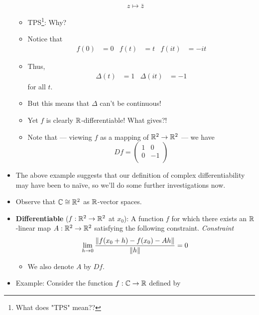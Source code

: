\documentclass[../notes.tex]{subfiles}
\begin{document}
\begin{itemize}
\begin{equation*}
        z \mapsto \bar{z}
    \end{equation*}
    \begin{itemize}
        \item TPS\footnote{What does "TPS" mean??}: Why?
        \item Notice that
        \begin{align*}
            f(0) &= 0&
            f(t) &= t&
            f(it) &= -it
        \end{align*}
        \item Thus,
        \begin{align*}
            \Delta(t) &= 1&
            \Delta(it) &= -1
        \end{align*}
        for all $t$.
        \item But this means that $\Delta$ can't be continuous!
        \item Yet $f$ is clearly $\mathbb{R}$-differentiable! What gives?!
        \item Note that --- viewing $f$ as a mapping of $\mathbb{R}^2\to\mathbb{R}^2$ --- we have
        \begin{equation*}
            Df =
            \begin{pmatrix}
                1 & 0\\
                0 & -1\\
            \end{pmatrix}
        \end{equation*}
    \end{itemize}
    \item The above example suggests that our definition of complex differentiability may have been to na\"{i}ve, so we'll do some further investigations now.
    \item Observe that $\mathbb{C}\cong\mathbb{R}^2$ as $\mathbb{R}$-vector spaces.
    \item \textbf{Differentiable} ($f:\mathbb{R}^2\to\mathbb{R}^2$ at $x_0$): A function $f$ for which there exists an $\mathbb{R}$-linear map $A:\mathbb{R}^2\to\mathbb{R}^2$ satisfying the following constraint. \emph{Constraint}
    \begin{equation*}
        \lim_{h\to 0}\frac{\norm{f(x_0+h)-f(x_0)-Ah}}{\norm{h}} = 0
    \end{equation*}
    \begin{itemize}
        \item We also denote $A$ by $Df$.
    \end{itemize}
    \pagebreak
    \item Example: Consider the function $f:\mathbb{C}\to\mathbb{R}$ defined by

\end{itemize}
\end{document}
